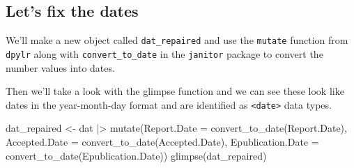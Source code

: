 \documentclass[
  letterpaper,
  DIV=11,
  numbers=noendperiod]{scrreprt}
\newenvironment{Shaded}{\begin{snugshade}}{\end{snugshade}}
\newcommand{\AttributeTok}[1]{\textcolor[rgb]{0.40,0.45,0.13}{#1}}
\newcommand{\FunctionTok}[1]{\textcolor[rgb]{0.28,0.35,0.67}{#1}}
\newcommand{\NormalTok}[1]{\textcolor[rgb]{0.00,0.23,0.31}{#1}}
\newcommand{\OtherTok}[1]{\textcolor[rgb]{0.00,0.23,0.31}{#1}}
\newcommand{\SpecialCharTok}[1]{\textcolor[rgb]{0.37,0.37,0.37}{#1}}
\begin{document}
\hypertarget{lets-fix-the-dates}{%
\subsection{Let's fix the dates}\label{lets-fix-the-dates}}

We'll make a new object called \texttt{dat\_repaired} and use the
\texttt{mutate} function from \texttt{dpylr} along with
\texttt{convert\_to\_date} in the \texttt{janitor} package to convert
the number values into dates.

Then we'll take a look with the glimpse function and we can see these
look like dates in the year-month-day format and are identified as
\texttt{\textless{}date\textgreater{}} data types.

\begin{Shaded}
\begin{Highlighting}[]
\NormalTok{dat\_repaired }\OtherTok{\textless{}{-}}\NormalTok{ dat }\SpecialCharTok{|\textgreater{}} \FunctionTok{mutate}\NormalTok{(}\AttributeTok{Report.Date =} \FunctionTok{convert\_to\_date}\NormalTok{(Report.Date),}
                              \AttributeTok{Accepted.Date =} \FunctionTok{convert\_to\_date}\NormalTok{(Accepted.Date),}
                              \AttributeTok{Epublication.Date =} \FunctionTok{convert\_to\_date}\NormalTok{(Epublication.Date))}
\FunctionTok{glimpse}\NormalTok{(dat\_repaired)}
\end{Highlighting}
\end{Shaded}
\end{document}
